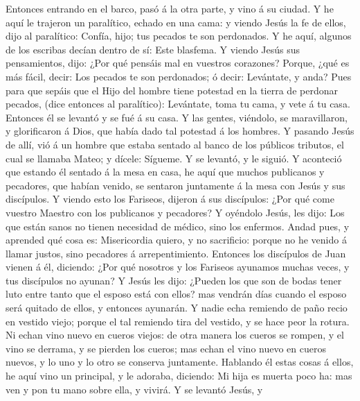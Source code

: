  Entonces entrando en el barco, pasó á la otra parte, y
vino á su ciudad.  Y he aquí le trajeron un paralítico,
echado en una cama: y viendo Jesús la fe de ellos, dijo al paralítico:
Confía, hijo; tus pecados te son perdonados.  Y he aquí,
algunos de los escribas decían dentro de sí: Este blasfema.
 Y viendo Jesús sus pensamientos, dijo: ¿Por qué pensáis
mal en vuestros corazones?  Porque, ¿qué es más fácil,
decir: Los pecados te son perdonados; ó decir: Levántate, y anda?
 Pues para que sepáis que el Hijo del hombre tiene
potestad en la tierra de perdonar pecados, (dice entonces al
paralítico): Levántate, toma tu cama, y vete á tu casa. 
Entonces él se levantó y se fué á su casa.  Y las gentes,
viéndolo, se maravillaron, y glorificaron á Dios, que había dado tal
potestad á los hombres.  Y pasando Jesús de allí, vió á un
hombre que estaba sentado al banco de los públicos tributos, el cual se
llamaba Mateo; y dícele: Sígueme. Y se levantó, y le siguió.
 Y aconteció que estando él sentado á la mesa en casa, he
aquí que muchos publicanos y pecadores, que habían venido, se sentaron
juntamente á la mesa con Jesús y sus discípulos.  Y
viendo esto los Fariseos, dijeron á sus discípulos: ¿Por qué come
vuestro Maestro con los publicanos y pecadores?  Y
oyéndolo Jesús, les dijo: Los que están sanos no tienen necesidad de
médico, sino los enfermos.  Andad pues, y aprended qué
cosa es: Misericordia quiero, y no sacrificio: porque no he venido á
llamar justos, sino pecadores á arrepentimiento. 
Entonces los discípulos de Juan vienen á él, diciendo: ¿Por qué nosotros
y los Fariseos ayunamos muchas veces, y tus discípulos no ayunan?
 Y Jesús les dijo: ¿Pueden los que son de bodas tener
luto entre tanto que el esposo está con ellos? mas vendrán días cuando
el esposo será quitado de ellos, y entonces ayunarán.  Y
nadie echa remiendo de paño recio en vestido viejo; porque el tal
remiendo tira del vestido, y se hace peor la rotura.  Ni
echan vino nuevo en cueros viejos: de otra manera los cueros se rompen,
y el vino se derrama, y se pierden los cueros; mas echan el vino nuevo
en cueros nuevos, y lo uno y lo otro se conserva juntamente.
 Hablando él estas cosas á ellos, he aquí vino un
principal, y le adoraba, diciendo: Mi hija es muerta poco ha: mas ven y
pon tu mano sobre ella, y vivirá.  Y se levantó Jesús, y
